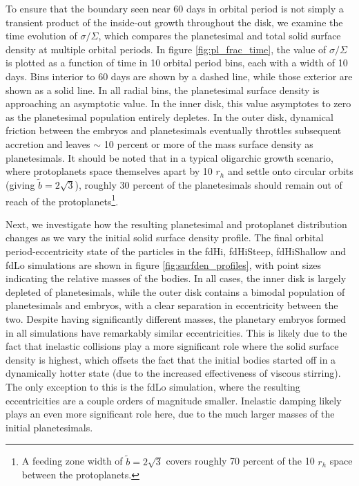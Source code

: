 \documentclass[twocolumn,linenumbers]{aastex63}
\begin{document}
To ensure that the boundary seen near 60 days in orbital period is not
simply a transient product of the inside-out growth throughout the
disk, we examine the time evolution of $\sigma/\Sigma$, which compares the planetesimal and total solid surface density at 
multiple orbital periods. In figure \ref{fig:pl_frac_time}, the value of
$\sigma/\Sigma$ is plotted as a function of time in 10 orbital period
bins, each with a width of 10 days.
Bins interior to 60 days are shown by a dashed line, while those exterior are shown as a solid line. In all radial bins, the 
planetesimal surface density is approaching an asymptotic value. In the inner disk, this value asymptotes to zero as the 
planetesimal population entirely depletes. In the outer disk, dynamical friction between the embryos and planetesimals 
eventually throttles subsequent accretion and leaves $\sim$ 10 percent or more of the mass surface density as planetesimals. It 
should be noted that in a typical oligarchic growth scenario, where protoplanets space themselves apart by 10 $r_{h}$ and settle 
onto circular orbits (giving $\tilde{b} = 2 \sqrt{3}$), roughly 30 percent of the planetesimals should remain out of reach of the 
protoplanets\footnote{A feeding zone width of $ \tilde{b} = 2 \sqrt{3}$ covers roughly 70 percent of the 10 $r_{h}$ space between the protoplanets.}.

Next, we investigate how the resulting planetesimal and protoplanet distribution
changes as we vary the initial solid surface density profile.
The final orbital period-eccentricity state of the
particles in the fdHi, fdHiSteep, fdHiShallow and fdLo simulations are shown in figure \ref{fig:surfden_profiles}, with point sizes 
indicating the relative masses of the bodies. In all cases, the inner disk is largely depleted of planetesimals, while the outer disk 
contains a bimodal population of planetesimals and embryos, with a clear separation in eccentricity between the two. Despite 
having significantly different masses, the planetary embryos formed in all simulations have remarkably similar eccentricities. This 
is likely due to the fact that inelastic collisions play a more significant role where the solid surface density is highest, which 
offsets the fact that the initial bodies started off in a dynamically hotter state (due to the increased effectiveness of viscous stirring). The only exception to this is the fdLo simulation, 
where the resulting eccentricities are a couple orders of magnitude smaller. Inelastic damping likely plays an even more 
significant role here, due to the much larger masses of the initial planetesimals.
\end{document}
